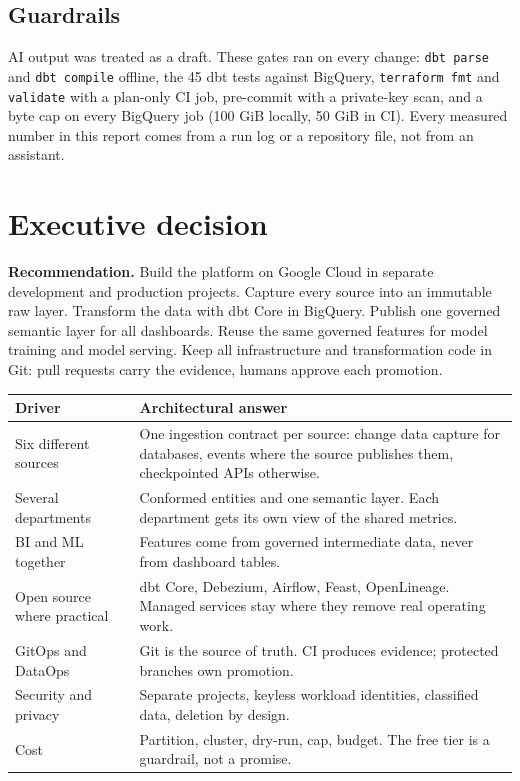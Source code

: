 \documentclass[10pt,a4paper]{article}
\newcommand{\code}[1]{\nolinkurl{#1}}
\begin{document}
\subsection{Guardrails}

AI output was treated as a draft. These gates ran on every change:
\code{dbt parse} and \code{dbt compile} offline, the 45 dbt tests against
BigQuery, \code{terraform fmt} and \code{validate} with a plan-only CI
job, pre-commit with a private-key scan, and a byte cap on every BigQuery
job (100 GiB locally, 50 GiB in CI). Every measured number in this
report comes from a run log or a repository file, not from an assistant.

\section{Executive decision}

\textbf{Recommendation.} Build the platform on Google Cloud in separate
development and production projects. Capture every source into an
immutable raw layer. Transform the data with dbt Core in BigQuery.
Publish one governed semantic layer for all dashboards. Reuse the same
governed features for model training and model serving. Keep all
infrastructure and transformation code in Git: pull requests carry the
evidence, humans approve each promotion.

\begin{tabularx}{\textwidth}{L{36mm}Y}
\toprule
\textbf{Driver} & \textbf{Architectural answer} \\
\midrule
Six different sources & One ingestion contract per source: change data capture for databases, events where the source publishes them, checkpointed APIs otherwise. \\
Several departments & Conformed entities and one semantic layer. Each department gets its own view of the shared metrics. \\
BI and ML together & Features come from governed intermediate data, never from dashboard tables. \\
Open source where practical & dbt Core, Debezium, Airflow, Feast, OpenLineage. Managed services stay where they remove real operating work. \\
GitOps and DataOps & Git is the source of truth. CI produces evidence; protected branches own promotion. \\
Security and privacy & Separate projects, keyless workload identities, classified data, deletion by design. \\
Cost & Partition, cluster, dry-run, cap, budget. The free tier is a guardrail, not a promise. \\
\bottomrule
\end{tabularx}
\end{document}
